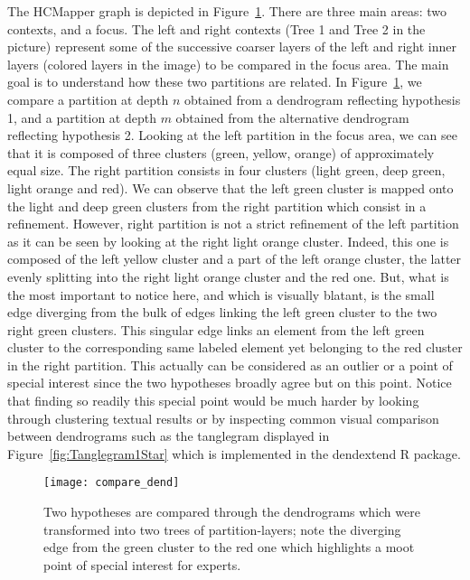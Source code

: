 \documentclass[10pt,conference,a4paper]{IEEEtran}
\begin{document}
The HCMapper graph is depicted in Figure~\ref{compare_dend}. There are three main areas: two contexts, and a focus. The left and right contexts (Tree 1 and Tree 2 in the picture) represent some of the successive coarser layers of the left and right inner layers (colored layers in the image) to be compared in the focus area. The main goal is to understand how these two partitions are related. In Figure~\ref{compare_dend}, we compare a partition at depth $n$ obtained from a dendrogram reflecting hypothesis 1, and a partition at depth $m$ obtained from the alternative dendrogram reflecting hypothesis 2. Looking at the left partition in the focus area, we can see that it is composed of three clusters (green, yellow, orange) of approximately equal size. The right partition consists in four clusters (light green, deep green, light orange and red). We can observe that the left green cluster is mapped onto the light and deep green clusters from the right partition which consist in a refinement.
However, right partition is not a strict refinement of the left partition as it can be seen by looking at the right light orange cluster. Indeed, this one is composed of the left yellow cluster and a part of the left orange cluster, the latter evenly splitting into the right light orange cluster and the red one.
But, what is the most important to notice here, and which is visually blatant, is the small edge diverging from the bulk of edges linking the left green cluster to the two right green clusters. This singular edge links an element from the left green cluster to the corresponding same labeled element yet belonging to the red cluster in the right partition. This actually can be considered as an outlier or a point of special interest since the two hypotheses broadly agree but on this point.
Notice that finding so readily this special point would be much harder by looking through clustering textual results or by inspecting common visual comparison between dendrograms such as the tanglegram displayed in Figure~\ref{fig:Tanglegram1Star} which is implemented in the dendextend R package.




\begin{figure}[htb]
  \centering
\texttt{[image: compare\_dend]}
  \caption{Two hypotheses are compared through the dendrograms which were transformed into two trees of partition-layers; note the diverging edge from the green cluster to the red one which highlights a moot point of special interest for experts.}
  \label{compare_dend}
\end{figure}
\end{document}
